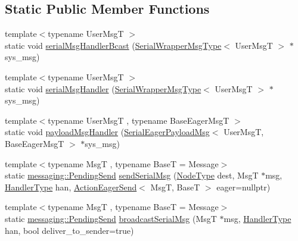 \subsection*{Static Public Member Functions}
\begin{DoxyCompactItemize}
\item 
{\footnotesize template$<$typename User\+MsgT $>$ }\\static void \hyperlink{structvt_1_1serialization_1_1_serialized_messenger_adc342b3e5a4a536182f6045c5fe485b7}{serial\+Msg\+Handler\+Bcast} (\hyperlink{structvt_1_1serialization_1_1_serialized_messenger_a279027d1664b42cf7f288dc3fc9c3014}{Serial\+Wrapper\+Msg\+Type}$<$ User\+MsgT $>$ $\ast$sys\+\_\+msg)
\item 
{\footnotesize template$<$typename User\+MsgT $>$ }\\static void \hyperlink{structvt_1_1serialization_1_1_serialized_messenger_aad74b93ed6e38beb26ce31d69eb85a71}{serial\+Msg\+Handler} (\hyperlink{structvt_1_1serialization_1_1_serialized_messenger_a279027d1664b42cf7f288dc3fc9c3014}{Serial\+Wrapper\+Msg\+Type}$<$ User\+MsgT $>$ $\ast$sys\+\_\+msg)
\item 
{\footnotesize template$<$typename User\+MsgT , typename Base\+Eager\+MsgT $>$ }\\static void \hyperlink{structvt_1_1serialization_1_1_serialized_messenger_adef4a4664f9eab8eca28304871540791}{payload\+Msg\+Handler} (\hyperlink{namespacevt_1_1serialization_af3a0dfd4a0d3fa09c75edba0dc1b7fec}{Serial\+Eager\+Payload\+Msg}$<$ User\+MsgT, Base\+Eager\+MsgT $>$ $\ast$sys\+\_\+msg)
\item 
{\footnotesize template$<$typename MsgT , typename BaseT  = Message$>$ }\\static \hyperlink{structvt_1_1messaging_1_1_pending_send}{messaging\+::\+Pending\+Send} \hyperlink{structvt_1_1serialization_1_1_serialized_messenger_a2e9c1f9f5c6923f8ad3467e62542f5ab}{send\+Serial\+Msg} (\hyperlink{namespacevt_a866da9d0efc19c0a1ce79e9e492f47e2}{Node\+Type} dest, MsgT $\ast$msg, \hyperlink{namespacevt_af64846b57dfcaf104da3ef6967917573}{Handler\+Type} han, \hyperlink{namespacevt_1_1serialization_a009aa1de8d42a3c97643b947fcc6f0b6}{Action\+Eager\+Send}$<$ MsgT, BaseT $>$ eager=nullptr)
\item 
{\footnotesize template$<$typename MsgT , typename BaseT  = Message$>$ }\\static \hyperlink{structvt_1_1messaging_1_1_pending_send}{messaging\+::\+Pending\+Send} \hyperlink{structvt_1_1serialization_1_1_serialized_messenger_aa72a9a7c6b1ea78eeccb928c68a4c505}{broadcast\+Serial\+Msg} (MsgT $\ast$msg, \hyperlink{namespacevt_af64846b57dfcaf104da3ef6967917573}{Handler\+Type} han, bool deliver\+\_\+to\+\_\+sender=true)

\end{DoxyCompactItemize}
